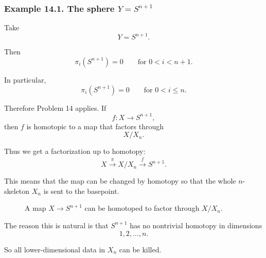 \documentclass[12pt,a4paper]{article}
\theoremstyle{notespace}
\begin{document}
\subsubsection*{Example 14.1. The sphere \(Y=S^{n+1}\)}

Take
\[
Y=S^{n+1}.
\]

Then
\[
\pi_i(S^{n+1})=0
\qquad
\text{for }0<i<n+1.
\]

In particular,
\[
\pi_i(S^{n+1})=0
\qquad
\text{for }0<i\leq n.
\]

Therefore Problem 14 applies. If
\[
f:X\to S^{n+1},
\]
then \(f\) is homotopic to a map that factors through
\[
X/X_n.
\]

Thus we get a factorization up to homotopy:
\[
X
\xrightarrow{\pi}
X/X_n
\xrightarrow{\overline f}
S^{n+1}.
\]

This means that the map can be changed by homotopy so that the whole \(n\)-skeleton \(X_n\) is sent to the basepoint.

\begin{figure}[htbp]
	\centering
	\caption{A map \(X\to S^{n+1}\) can be homotoped to factor through \(X/X_n\).}
\end{figure}

The reason this is natural is that \(S^{n+1}\) has no nontrivial homotopy in dimensions
\[
1,2,\ldots,n.
\]

So all lower-dimensional data in \(X_n\) can be killed.
\end{document}
